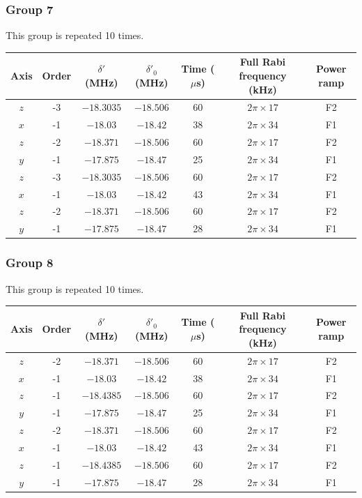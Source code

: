 \documentclass[aps,secnumarabic,amsmath,amssymb]{revtex4}
\begin{document}
\subsubsection{Group 7}
This group is repeated 10 times.
\begin{center}
  \begin{tabular}{|c|c|c|c|c|c|c|}
    \hline
    Axis&Order&$\delta'$ (MHz)&$\delta'_0$ (MHz)&Time ($\mu$s)&Full Rabi frequency (kHz)&Power ramp\\\hline
    $z$&-3&$-18.3035$&$-18.506$&60&$2\pi\times17$&F2\\\hline
    $x$&-1&$-18.03$&$-18.42$&38&$2\pi\times34$&F1\\\hline
    $z$&-2&$-18.371$&$-18.506$&60&$2\pi\times17$&F2\\\hline
    $y$&-1&$-17.875$&$-18.47$&25&$2\pi\times34$&F1\\\hline
    $z$&-3&$-18.3035$&$-18.506$&60&$2\pi\times17$&F2\\\hline
    $x$&-1&$-18.03$&$-18.42$&43&$2\pi\times34$&F1\\\hline
    $z$&-2&$-18.371$&$-18.506$&60&$2\pi\times17$&F2\\\hline
    $y$&-1&$-17.875$&$-18.47$&28&$2\pi\times34$&F1\\\hline
  \end{tabular}
\end{center}
\subsubsection{Group 8}
This group is repeated 10 times.
\begin{center}
  \begin{tabular}{|c|c|c|c|c|c|c|}
    \hline
    Axis&Order&$\delta'$ (MHz)&$\delta'_0$ (MHz)&Time ($\mu$s)&Full Rabi frequency (kHz)&Power ramp\\\hline
    $z$&-2&$-18.371$&$-18.506$&60&$2\pi\times17$&F2\\\hline
    $x$&-1&$-18.03$&$-18.42$&38&$2\pi\times34$&F1\\\hline
    $z$&-1&$-18.4385$&$-18.506$&60&$2\pi\times17$&F2\\\hline
    $y$&-1&$-17.875$&$-18.47$&25&$2\pi\times34$&F1\\\hline
    $z$&-2&$-18.371$&$-18.506$&60&$2\pi\times17$&F2\\\hline
    $x$&-1&$-18.03$&$-18.42$&43&$2\pi\times34$&F1\\\hline
    $z$&-1&$-18.4385$&$-18.506$&60&$2\pi\times17$&F2\\\hline
    $y$&-1&$-17.875$&$-18.47$&28&$2\pi\times34$&F1\\\hline
  \end{tabular}
\end{center}
\end{document}

